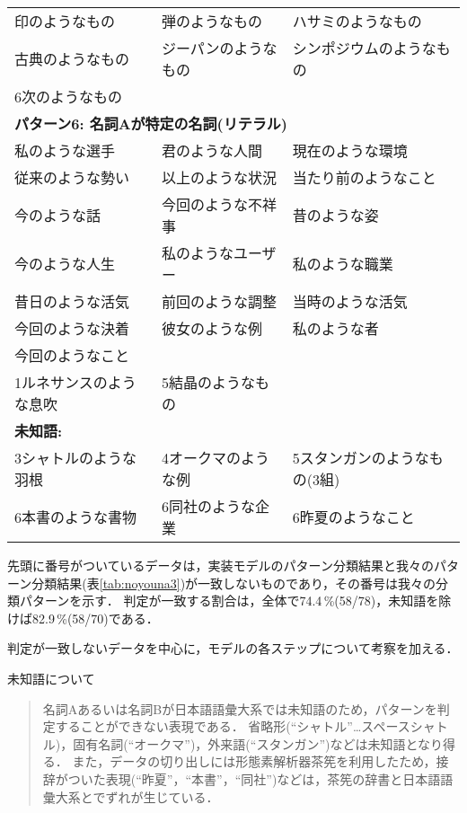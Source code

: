 \begin{table}[htbp]
\begin{center}
\begin{small}
\begin{tabular}{|lll|}
		印のようなもの & 弾のようなもの & ハサミのようなもの \\
		古典のようなもの & ジーパンのようなもの & シンポジウムのようなもの \\
		\hline
		6次のようなもの & & \\
		\hline
		\hline
		\multicolumn{3}{|l|}{{\bf パターン6: 名詞Aが特定の名詞(リテラル)}} \\
		\hline
		私のような選手 & 君のような人間 & 現在のような環境 \\
		従来のような勢い & 以上のような状況 & 当たり前のようなこと \\
		今のような話 & 今回のような不祥事 & 昔のような姿 \\
		今のような人生 & 私のようなユーザー & 私のような職業 \\
		昔日のような活気 & 前回のような調整 & 当時のような活気 \\
		今回のような決着 & 彼女のような例 & 私のような者 \\
		今回のようなこと & & \\
		\hline
		1ルネサンスのような息吹 & 5結晶のようなもの & \\
		\hline
		\hline
		\multicolumn{3}{|l|}{{\bf 未知語: }} \\
		\hline
		3シャトルのような羽根 & 4オークマのような例 & 5スタンガンのようなもの(3組) \\
		6本書のような書物 & 6同社のような企業 & 6昨夏のようなこと \\
		\hline
	\end{tabular}
	\end{small}
	\end{center}
	\label{tab:kekka1}
\end{table}

先頭に番号がついているデータは，実装モデルのパターン分類結果と我々のパターン分類結果(表\ref{tab:noyouna3})が一致しないものであり，その番号は我々の分類パターンを示す．
判定が一致する割合は，全体で74.4\,\%(58/78)，未知語を除けば82.9\,\%(58/70)である．

判定が一致しないデータを中心に，モデルの各ステップについて考察を加える．

\medskip
未知語について
\begin{quote}
名詞Aあるいは名詞Bが日本語語彙大系では未知語のため，パターンを判定することができない表現である．
省略形(``シャトル''…スペースシャトル)，固有名詞(``オークマ'')，外来語(``スタンガン'')などは未知語となり得る．
また，データの切り出しには形態素解析器茶筅\cite{Chasen-1}を利用したため，接辞がついた表現(``昨夏''，``本書''，``同社'')などは，茶筅の辞書と日本語語彙大系とでずれが生じている．
\end{quote}

